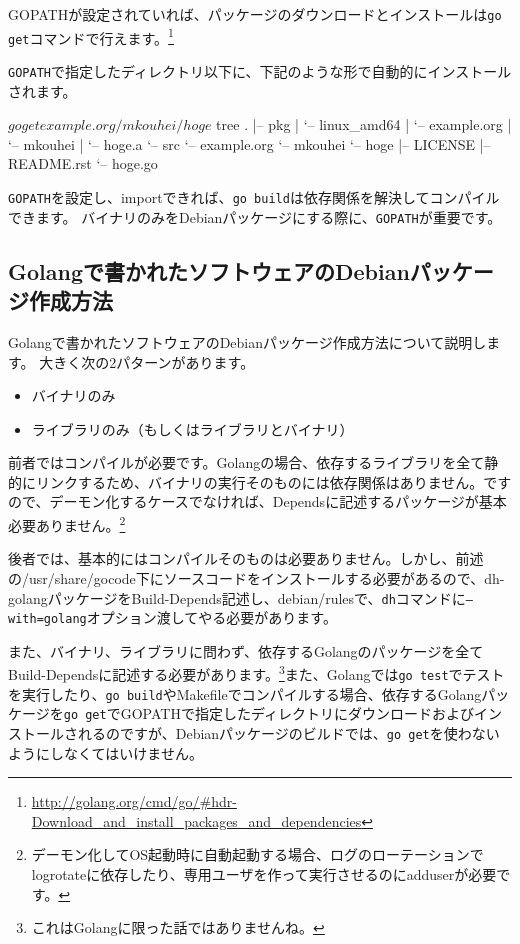 \documentclass[mingoth,a4paper]{jsarticle}
\begin{document}
GOPATHが設定されていれば、パッケージのダウンロードとインストールは\texttt{go get}コマンドで行えます。\footnote{\url{http://golang.org/cmd/go/\#hdr-Download_and_install_packages_and_dependencies}}

\texttt{GOPATH}で指定したディレクトリ以下に、下記のような形で自動的にインストールされます。

\begin{commandline}
$ go get example.org/mkouhei/hoge
$ tree
.
|-- pkg
|   `-- linux_amd64
|       `-- example.org
|           `-- mkouhei
|               `-- hoge.a
`-- src
    `-- example.org
        `-- mkouhei
            `-- hoge
                |-- LICENSE
                |-- README.rst
                `-- hoge.go
\end{commandline}

\texttt{GOPATH}を設定し、importできれば、\texttt{go build}は依存関係を解決してコンパイルできます。
バイナリのみをDebianパッケージにする際に、\texttt{GOPATH}が重要です。

\subsection{Golangで書かれたソフトウェアのDebianパッケージ作成方法}

Golangで書かれたソフトウェアのDebianパッケージ作成方法について説明します。
大きく次の2パターンがあります。

\begin{itemize}
\item バイナリのみ
\item ライブラリのみ（もしくはライブラリとバイナリ）
\end{itemize}

前者ではコンパイルが必要です。Golangの場合、依存するライブラリを全て静的にリンクするため、バイナリの実行そのものには依存関係はありません。ですので、デーモン化するケースでなければ、Dependsに記述するパッケージが基本必要ありません。\footnote{デーモン化してOS起動時に自動起動する場合、ログのローテーションでlogrotateに依存したり、専用ユーザを作って実行させるのにadduserが必要です。}

後者では、基本的にはコンパイルそのものは必要ありません。しかし、前述の/usr/share/gocode下にソースコードをインストールする必要があるので、dh-golangパッケージをBuild-Depends記述し、debian/rulesで、\texttt{dh}コマンドに\texttt{--with=golang}オプション渡してやる必要があります。

また、バイナリ、ライブラリに問わず、依存するGolangのパッケージを全てBuild-Dependsに記述する必要があります。\footnote{これはGolangに限った話ではありませんね。}また、Golangでは\texttt{go test}でテストを実行したり、\texttt{go build}やMakefileでコンパイルする場合、依存するGolangパッケージを\texttt{go get}でGOPATHで指定したディレクトリにダウンロードおよびインストールされるのですが、Debianパッケージのビルドでは、\texttt{go get}を使わないようにしなくてはいけません。
\end{document}
